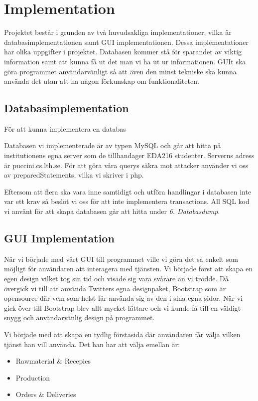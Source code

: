 \section{Implementation}

Projektet består i grunden av två huvudsakliga implementationer, vilka är databasimplementationen samt GUI implementationen. Dessa implementationer har olika uppgifter i projektet. Databasen kommer stå för sparandet av viktig information samt att kunna få ut det man vi ha ut ur informationen. GUIt ska göra programmet användarvänligt så att även den minst tekniske ska kunna använda det utan att ha någon förkunskap om funktionaliteten.

\subsection{Databasimplementation}

För att kunna implementera en databas

Databasen vi implementerade är av typen MySQL och går att hitta på institutionens egna server som de tillhandager EDA216 studenter. Serverns adress är puccini.cs.lth.se. För att göra våra querys säkra mot attacker använder vi oss av preparedStatements, vilka vi skriver i php. 

Eftersom att flera ska vara inne samtidigt och utföra handlingar i databasen inte var ett krav så beslöt vi oss för att inte implementera transactions. All SQL kod vi använt för att skapa databasen går att hitta under \emph{6. Databasdump}.

\subsection{GUI Implementation}

När vi började med vårt GUI till programmet ville vi göra det så enkelt som möjligt för användaren att interagera med tjänsten. Vi började först att skapa en egen design vilket tog sin tid och visade sig vara svårare än vi trodde. Då övergick vi till att använda Twitters egna designpaket, Bootstrap som är opensource där vem som helst får använda sig av den i sina egna sidor. När vi gick över till Bootstrap blev allt mycket lättare och vi kunde få till en väldigt snygg och användarvänlig design på programmet.

Vi började med att skapa en tydlig förstasida där användaren får välja vilken tjänst han vill använda. Det han har att välja emellan är:

\begin{itemize}
\item{Rawmaterial \& Recepies}
\item{Production}
\item{Orders \& Deliveries}
\end{itemize}

